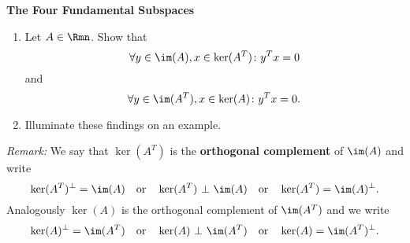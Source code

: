 \textbf{The Four Fundamental Subspaces}

\begin{enumerate}
	\item Let $A \in \Rmn$. Show that $$\forall y \in \im(A), x\in \ker(A^T)\colon y^Tx = 0 $$
and $$\forall y \in \im(A^T), x\in \ker(A)\colon y^Tx = 0 .$$
\item Illuminate these findings on an example.
\end{enumerate}
{\color{navy}\textit{Remark:} 
We say that $\ker(A^T)$ is the \textbf{orthogonal complement} of $\im(A)$ and write
$$\ker(A^T)^\bot = \im(A)~~~\text{or}~~~\ker(A^T) ~\bot  ~ \im(A)~~~\text{or}~~~\ker(A^T) = \im(A)^\bot.$$
Analogously $\ker(A)$ is the orthogonal complement of $\im(A^T)$ and we write
$$\ker(A)^\bot = \im(A^T)~~~\text{or}~~~\ker(A) ~\bot  ~ \im(A^T)~~~\text{or}~~~\ker(A) = \im(A^T)^\bot.$$}
